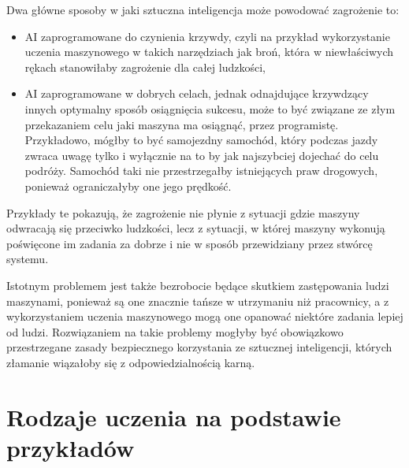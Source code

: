 Dwa główne sposoby w jaki sztuczna inteligencja może powodować zagrożenie to:
\begin{itemize}
    \item AI zaprogramowane do czynienia krzywdy, czyli na przykład wykorzystanie uczenia maszynowego
    w takich narzędziach jak broń, która w niewłaściwych rękach stanowiłaby zagrożenie dla całej ludzkości,
    \item AI zaprogramowane w dobrych celach, jednak odnajdujące krzywdzący innych optymalny
    sposób osiągnięcia sukcesu, może to być związane ze złym przekazaniem celu jaki maszyna ma osiągnąć, przez 
    programistę. Przykładowo, mógłby to być samojezdny samochód, który podczas jazdy zwraca uwagę tylko i wyłącznie 
    na to by jak najszybciej dojechać do celu podróży. Samochód taki nie przestrzegałby istniejących praw drogowych,
    ponieważ ograniczałyby one jego prędkość.
\end{itemize}
Przykłady te pokazują, że zagrożenie nie płynie z sytuacji gdzie maszyny odwracają się przeciwko ludzkości, lecz 
z sytuacji, w której maszyny wykonują poświęcone im zadania za dobrze i nie w sposób przewidziany przez 
stwórcę systemu.

Istotnym problemem jest także bezrobocie będące skutkiem zastępowania ludzi maszynami,
ponieważ są one znacznie tańsze w utrzymaniu niż pracownicy, a z wykorzystaniem uczenia
maszynowego mogą one opanować niektóre zadania lepiej od ludzi.
Rozwiązaniem na takie problemy mogłyby być obowiązkowo przestrzegane zasady bezpiecznego korzystania
ze sztucznej inteligencji, których złamanie wiązałoby się z odpowiedzialnością karną.
\section{Rodzaje uczenia na podstawie przykładów}

